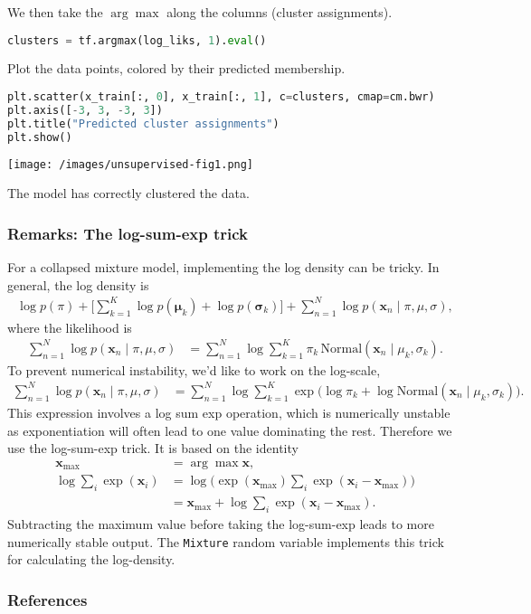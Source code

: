 We then take the $\arg\max$ along the columns (cluster assignments).
\begin{lstlisting}[language=Python]
clusters = tf.argmax(log_liks, 1).eval()
\end{lstlisting}

Plot the data points, colored by their predicted membership.
\begin{lstlisting}[language=Python]
plt.scatter(x_train[:, 0], x_train[:, 1], c=clusters, cmap=cm.bwr)
plt.axis([-3, 3, -3, 3])
plt.title("Predicted cluster assignments")
plt.show()
\end{lstlisting}

\texttt{[image: /images/unsupervised-fig1.png]}

The model has correctly clustered the data.

\subsubsection{Remarks: The log-sum-exp trick}

For a collapsed mixture model, implementing the log density can be tricky.
In general, the log density is
\begin{align*}
  \log p(\pi) +
  \Big[ \sum_{k=1}^K \log p(\mathbf{\mu}_k) + \log
  p(\mathbf{\sigma}_k) \Big] +
  \sum_{n=1}^N \log p(\mathbf{x}_n \mid \pi, \mu, \sigma),
\end{align*}
where the likelihood is
\begin{align*}
  \sum_{n=1}^N \log p(\mathbf{x}_n \mid \pi, \mu, \sigma)
  &=
  \sum_{n=1}^N \log \sum_{k=1}^K \pi_k \, \text{Normal}(\mathbf{x}_n \mid
  \mu_k, \sigma_k).
\end{align*}
To prevent numerical instability, we'd like to work on the log-scale,
\begin{align*}
  \sum_{n=1}^N \log p(\mathbf{x}_n \mid \pi, \mu, \sigma)
  &=
  \sum_{n=1}^N \log \sum_{k=1}^K \exp\Big(
  \log \pi_k + \log \text{Normal}(\mathbf{x}_n \mid \mu_k, \sigma_k)\Big).
\end{align*}
This expression involves a log sum exp operation, which is
numerically unstable as exponentiation will often lead to one value
dominating the rest. Therefore we use the log-sum-exp trick.
It is based on the identity
\begin{align*}
  \mathbf{x}_{\mathrm{max}}
  &=
  \arg\max \mathbf{x},
  \\
  \log \sum_i \exp(\mathbf{x}_i)
  &=
  \log \Big(\exp(\mathbf{x}_{\mathrm{max}}) \sum_i \exp(\mathbf{x}_i -
  \mathbf{x}_{\mathrm{max}})\Big)
  \\
  &=
  \mathbf{x}_{\mathrm{max}} + \log \sum_i \exp(\mathbf{x}_i -
  \mathbf{x}_{\mathrm{max}}).
\end{align*}
Subtracting the maximum value before taking the log-sum-exp leads to
more numerically stable output. The \texttt{Mixture} random variable
implements this trick for calculating the log-density.

\subsubsection{References}\label{references}
